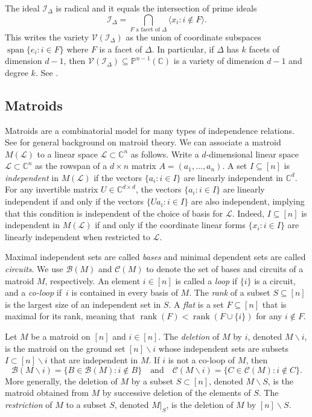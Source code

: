 \documentclass[10pt]{amsart}
\theoremstyle{definition}
\newcommand{\PP}{\mathbb{P}}
\newcommand{\Cbb}{\mathbb{C}}
\newcommand{\V}{\mathcal{V}}
\newcommand{\I}{\mathcal{I}}
\newcommand{\cL}{\mathcal{L}}
\newcommand{\CC}{\mathcal{C}}
\newcommand{\B}{\mathcal{B}}
\DeclareMathOperator{\spanrm}{span}
\DeclareMathOperator{\rank}{rank}
\begin{document}
The ideal $\I_{\Delta}$ is radical 
and it equals the intersection of prime ideals
\[
\I_{\Delta} = \bigcap_{F \text{ a facet of }\Delta} \langle x_i : i\not\in F \rangle.
\]
This writes the variety $\V(\I_{\Delta})$ as the union of coordinate subspaces $\spanrm \{e_i : i\in F\}$ 
where $F$ is a facet of $\Delta$. In particular, if $\Delta$ has $k$ facets of dimension $d-1$, then 
$\V(\I_{\Delta})\subseteq \PP^{n-1}(\Cbb)$ is a variety of dimension $d-1$ and degree $k$. See \cite[Chapter~II]{StanleyCCABook}. 


\subsection{Matroids}
Matroids are a combinatorial model for many types of independence relations. See \cite{Oxley} for 
general background on matroid theory. We can associate a matroid $M(\cL)$ to a linear space $\cL\subset \Cbb^n$ as follows.
Write a $d$-dimensional linear space $\cL\subset \Cbb^n$ as the rowspan of a $d\times n$ matrix $A = (a_1, \ldots , a_n)$. 
A set $I \subseteq [n]$ is \emph{independent} in $M(\cL)$ 
if the vectors $\{a_i : i\in I\}$ are linearly independent in $\Cbb^d$. For any invertible matrix $U\in \Cbb^{d\times d}$, the vectors $\{a_i : i\in I\}$
are linearly independent if and only if the vectors $\{Ua_i : i\in I\}$ are also independent, implying that this condition is independent of the choice of basis for $\cL$. 
Indeed, $I\subseteq [n]$ is independent in $M(\cL)$ if and only if the coordinate linear forms $\{x_i : i\in I\}$ are linearly independent when restricted to $\cL$. 


Maximal independent sets are called \emph{bases} and minimal dependent sets are called \emph{circuits}. We use $\B(M)$ and $\CC (M)$ to denote the 
set of bases and circuits of a matroid $M$, respectively. An element $i\in [n]$ is called a \emph{loop} if $\{i\}$ is a circuit, and a \emph{co-loop} if~$i$ is contained in 
every basis of $M$. 
The \emph{rank} of a subset $S \subseteq [n]$ is the largest size of an independent set in $S$. A \emph{flat} is a set $F\subseteq [n]$ that is maximal for its rank, meaning that 
$\rank(F) <\rank (F \cup \{i\}) $ for any $i\not\in F$. 


Let $M$ be a matroid on $[n]$ and $i \in [n]$. The \emph{deletion} of $M$ by $i$, denoted $M\backslash i $, is the matroid
on the ground set $[n]\backslash i$ whose independent sets are subsets $I\subset [n]\backslash i$ that are independent in $M$. 
If $i$ is not a co-loop of $M$, then 
\[
\B(M\backslash i) = \{ B\in \B (M): i\notin B \} 
\quad \text{and} \quad
\CC (M\backslash i) = \{C\in \CC (M):i\notin C \}. 
\]
More generally, the deletion of $M$ by a subset $S\subset [n]$, denoted $M\backslash S$, is the matroid obtained from $M$ by 
successive deletion of the elements of $S$. The \emph{restriction} of $M$ to a subset $S$, denoted $M|_S$, is 
the deletion of $M$ by $[n]\backslash S$. 
\end{document}
